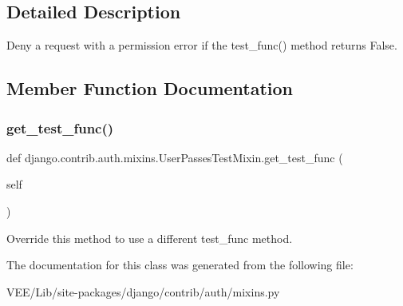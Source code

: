 \subsection{Detailed Description}
\begin{DoxyVerb}Deny a request with a permission error if the test_func() method returns
False.
\end{DoxyVerb}
 

\subsection{Member Function Documentation}
\mbox{\label{classdjango_1_1contrib_1_1auth_1_1mixins_1_1_user_passes_test_mixin_af917f3976d6e7c99ad76fed024c98df4}} 
\subsubsection{\texorpdfstring{get\+\_\+test\+\_\+func()}{get\_test\_func()}}
{\footnotesize\ttfamily def django.\+contrib.\+auth.\+mixins.\+User\+Passes\+Test\+Mixin.\+get\+\_\+test\+\_\+func (\begin{DoxyParamCaption}\item[{}]{self }\end{DoxyParamCaption})}

\begin{DoxyVerb}Override this method to use a different test_func method.
\end{DoxyVerb}
 

The documentation for this class was generated from the following file\+:\begin{DoxyCompactItemize}
\item 
V\+E\+E/\+Lib/site-\/packages/django/contrib/auth/mixins.\+py\end{DoxyCompactItemize}
